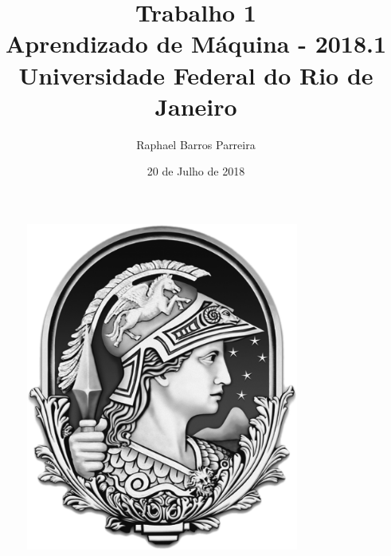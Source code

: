 \documentclass[a4paper, 10pt]{article}
\title{Trabalho 1 \\Aprendizado de Máquina - 2018.1\\ Universidade Federal do Rio de Janeiro
}
\author{Raphael Barros Parreira \\
}
\date{20 de Julho de 2018}
\begin{document}
\maketitle
\thispagestyle{empty}
\begin{figure}[H]
	\centering
	\includegraphics[keepaspectratio,width=0.8\textwidth]{img/minerva}
\end{figure}


\newpage
\renewcommand*\contentsname{Índice}
\tableofcontents
\newpage







\end{document}
